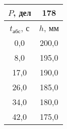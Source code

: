 \begin{tabular}[t]{|c|c|}
\hline
$P$, дел & 178 \\
\hline
$t_{абс}$, с & $h$, мм \\ 
\hline
0,0 & 200,0 \\ 
8,0 & 195,0 \\ 
17,0 & 190,0 \\ 
26,0 & 185,0 \\ 
34,0 & 180,0 \\ 
42,0 & 175,0 \\ 
\hline
\end{tabular}